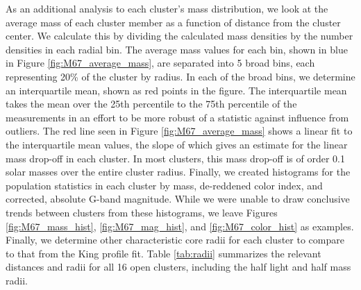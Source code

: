 \documentclass[onecolumn,table,xcdraw,super]{aastex631}
\begin{document}
As an additional analysis to each cluster's mass distribution, we look at the average mass of each cluster member as a function of distance from the cluster center. We calculate this by dividing the calculated mass densities by the number densities in each radial bin. The average mass values for each bin, shown in blue in Figure \ref{fig:M67_average_mass}, are separated into 5 broad bins, each representing 20\% of the cluster by radius. In each of the broad bins, we determine an interquartile mean, shown as red points in the figure. The interquartile mean takes the mean over the 25th percentile to the 75th percentile of the measurements in an effort to be more robust of a statistic against influence from outliers. The red line seen in Figure \ref{fig:M67_average_mass} shows a linear fit to the interquartile mean values, the slope of which gives an estimate for the linear mass drop-off in each cluster. In most clusters, this mass drop-off is of order 0.1 solar masses over the entire cluster radius. Finally, we created histograms for the population statistics in each cluster by mass, de-reddened color index, and corrected, absolute G-band magnitude. While we were unable to draw conclusive trends between clusters from these histograms, we leave Figures \ref{fig:M67_mass_hist}, \ref{fig:M67_mag_hist}, and \ref{fig:M67_color_hist} as examples. Finally, we determine other characteristic core radii for each cluster to compare to that from the King profile fit. Table \ref{tab:radii} summarizes the relevant distances and radii for all 16 open clusters, including the half light and half mass radii.
\end{document}
